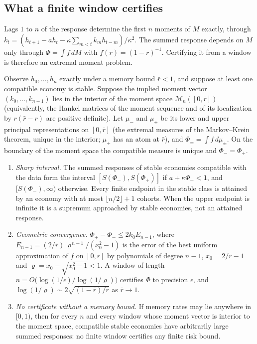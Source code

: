     \subsection{What a finite window certifies}
Lags $1$ to $n$ of the response determine the first $n$ moments of $M$ exactly, through $k_t=(h_{t+1}-ah_t-\kappa\sum_{m<t}k_mh_{t-m})/\kappa^2$. The summed response depends on $M$ only through $\Phi=\int f\,dM$ with $f(r)=(1-r)^{-1}$. Certifying it from a window is therefore an extremal moment problem.

\begin{theorem}\label{p2:thm:window}
Observe $h_0,\ldots,h_n$ exactly under a memory bound $\bar r<1$, and suppose at least one compatible economy is stable. Suppose the implied moment vector $(k_0,\ldots,k_{n-1})$ lies in the interior of the moment space $\mathcal M_n([0,\bar r])$ (equivalently, the Hankel matrices of the moment sequence and of its localization by $r(\bar r-r)$ are positive definite). Let $\mu_-$ and $\mu_+$ be its lower and upper principal representations on $[0,\bar r]$ (the extremal measures of the Markov--Krein theorem, unique in the interior; $\mu_+$ has an atom at $\bar r$), and $\Phi_\pm=\int f\,d\mu_\pm$. On the boundary of the moment space the compatible measure is unique and $\Phi_-=\Phi_+$.
\begin{enumerate}[label=(\roman*)]
\item \emph{Sharp interval.} The summed responses of stable economies compatible with the data form the interval $[S(\Phi_-),S(\Phi_+)]$ if $a+\kappa\Phi_+<1$, and $[S(\Phi_-),\infty)$ otherwise. Every finite endpoint in the stable class is attained by an economy with at most $\lfloor n/2\rfloor+1$ cohorts. When the upper endpoint is infinite it is a supremum approached by stable economies, not an attained response.
\item \emph{Geometric convergence.} $\Phi_+-\Phi_-\le2k_0E_{n-1}$, where $E_{n-1}=(2/\bar r)\,\varrho^{\,n-1}/(x_0^2-1)$ is the error of the best uniform approximation of $f$ on $[0,\bar r]$ by polynomials of degree $n-1$, $x_0=2/\bar r-1$ and $\varrho=x_0-\sqrt{x_0^2-1}<1$. A window of length $n=O\bigl(\log(1/\epsilon)/\log(1/\varrho)\bigr)$ certifies $\Phi$ to precision $\epsilon$, and $\log(1/\varrho)\sim2\sqrt{(1-\bar r)/\bar r}$ as $\bar r\to1$.
\item \emph{No certificate without a memory bound.} If memory rates may lie anywhere in $[0,1)$, then for every $n$ and every window whose moment vector is interior to the moment space, compatible stable economies have arbitrarily large summed responses: no finite window certifies any finite risk bound.
\end{enumerate}
\end{theorem}


